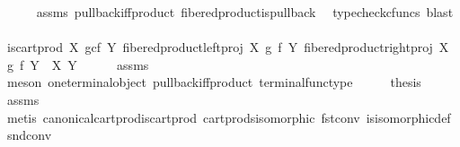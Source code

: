 \begin{isabellebody}
\ \ \ \ \isamarkupfalse%
\ assms\ pullback{\isacharunderscore}{\kern0pt}iff{\isacharunderscore}{\kern0pt}product\ fibered{\isacharunderscore}{\kern0pt}product{\isacharunderscore}{\kern0pt}is{\isacharunderscore}{\kern0pt}pullback\ \isamarkupfalse%
\ {\isacharparenleft}{\kern0pt}typecheck{\isacharunderscore}{\kern0pt}cfuncs{\isacharcomma}{\kern0pt}\ blast{\isacharparenright}{\kern0pt}\isanewline
\ \ \isamarkupfalse%
\ \isamarkupfalse%
\ {\isachardoublequoteopen}{\isacharparenleft}{\kern0pt}is{\isacharunderscore}{\kern0pt}cart{\isacharunderscore}{\kern0pt}prod\ {\isacharparenleft}{\kern0pt}X\ \isactrlbsub g\isactrlesub {\isasymtimes}\isactrlsub c\isactrlbsub f\isactrlesub \ Y{\isacharparenright}{\kern0pt}\ {\isacharparenleft}{\kern0pt}fibered{\isacharunderscore}{\kern0pt}product{\isacharunderscore}{\kern0pt}left{\isacharunderscore}{\kern0pt}proj\ X\ g\ f\ Y{\isacharparenright}{\kern0pt}\ {\isacharparenleft}{\kern0pt}fibered{\isacharunderscore}{\kern0pt}product{\isacharunderscore}{\kern0pt}right{\isacharunderscore}{\kern0pt}proj\ X\ g\ f\ Y{\isacharparenright}{\kern0pt}\ \ X\ Y{\isacharparenright}{\kern0pt}{\isachardoublequoteclose}\isanewline
\ \ \ \ \isamarkupfalse%
\ assms\ \isamarkupfalse%
\ {\isacharparenleft}{\kern0pt}meson\ one{\isacharunderscore}{\kern0pt}terminal{\isacharunderscore}{\kern0pt}object\ pullback{\isacharunderscore}{\kern0pt}iff{\isacharunderscore}{\kern0pt}product\ terminal{\isacharunderscore}{\kern0pt}func{\isacharunderscore}{\kern0pt}type{\isacharparenright}{\kern0pt}\isanewline
\ \ \isamarkupfalse%
\ \isamarkupfalse%
\ {\isacharquery}{\kern0pt}thesis\isanewline
\ \ \ \ \isamarkupfalse%
\ assms\ \isamarkupfalse%
\ {\isacharparenleft}{\kern0pt}metis\ canonical{\isacharunderscore}{\kern0pt}cart{\isacharunderscore}{\kern0pt}prod{\isacharunderscore}{\kern0pt}is{\isacharunderscore}{\kern0pt}cart{\isacharunderscore}{\kern0pt}prod\ cart{\isacharunderscore}{\kern0pt}prods{\isacharunderscore}{\kern0pt}isomorphic\ fst{\isacharunderscore}{\kern0pt}conv\ is{\isacharunderscore}{\kern0pt}isomorphic{\isacharunderscore}{\kern0pt}def\ snd{\isacharunderscore}{\kern0pt}conv{\isacharparenright}{\kern0pt}\isanewline
{}\isamarkupfalse%
%
\endisatagproof
{\isafoldproof}%
%
\isadelimproof
\isanewline
%
\endisadelimproof
%
\isadelimtheory
\isanewline
%
\endisadelimtheory
%
\isatagtheory
{}\isamarkupfalse%
%
\endisatagtheory
{\isafoldtheory}%
%
\isadelimtheory
%
\endisadelimtheory
%
\end{isabellebody}%
